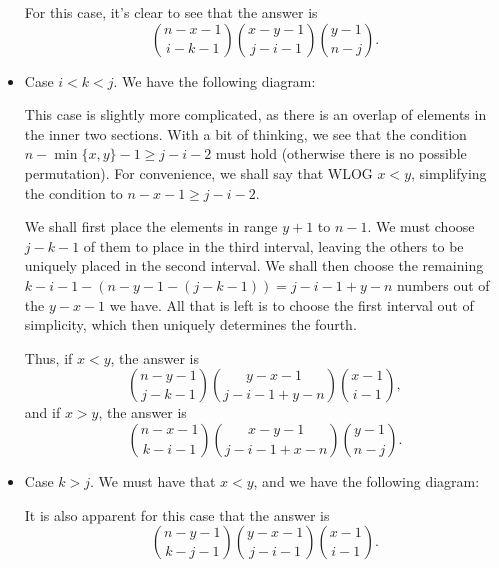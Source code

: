 \documentclass[a4paper, 12pt]{article}
\begin{document}
\begin{solution}
\begin{itemize}
            For this case, it's clear to see that the answer is
            \[
                \binom{n - x - 1}{i - k - 1} \binom{x - y - 1}{j - i - 1}  \binom{y - 1}{n - j}  
            .\]
        \item Case \( i < k < j \). We have the following diagram:
            \begin{figure}[h]
                \centering
                
            \end{figure}

            This case is slightly more complicated, as there is an overlap of elements in the inner two sections. With a bit of thinking, we see that the condition \( n - \min\{x, y\} - 1 \ge j - i - 2 \) must hold (otherwise there is no possible permutation). For convenience, we shall say that WLOG \( x < y \), simplifying the condition to \( n - x - 1 \ge j - i - 2 \).

            We shall first place the elements in range \( y + 1 \) to \( n - 1 \). We must choose \( j - k - 1 \) of them to place in the third interval, leaving the others to be uniquely placed in the second interval. We shall then choose the remaining \( k - i - 1 - (n - y - 1 - (j - k - 1)) = j - i - 1 + y - n \) numbers out of the \( y - x - 1 \) we have. All that is left is to choose the first interval out of simplicity, which then uniquely determines the fourth.

            Thus, if \( x < y \), the answer is
            \[
                \binom{n - y - 1}{j - k - 1}  \binom{y - x - 1}{j - i - 1 + y - n}  \binom{x - 1}{i - 1} 
            ,\]
            and if \( x > y \), the answer is
            \[
                \binom{n - x - 1}{k - i - 1} \binom{x - y - 1}{j - i - 1 + x - n} \binom{y - 1}{n - j} 
            .\]
        \item Case \( k > j \). We must have that \( x < y \), and we have the following diagram:
            \begin{figure}[H]
                \centering
                
            \end{figure}

            It is also apparent for this case that the answer is
            \[
                \binom{n - y - 1}{k - j - 1} \binom{y - x - 1}{j - i - 1} \binom{x - 1}{i - 1} 
            .\]
    \end{itemize}
\end{solution}
\end{document}
